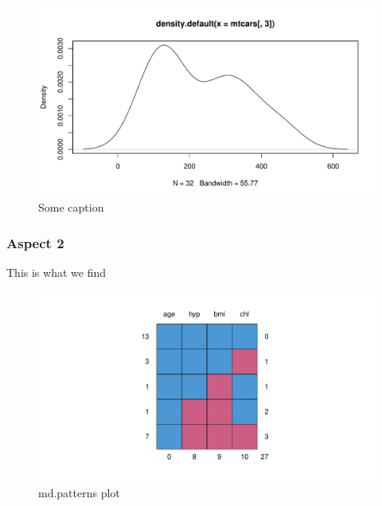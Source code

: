 \documentclass[a4paper,doc,floatsintext,natbib]{apa6}\usepackage[]{graphicx}\usepackage[]{xcolor}
\makeatletter
\def\maxwidth{ %
  \ifdim\Gin@nat@width>\linewidth
    \linewidth
  \else
    \Gin@nat@width
  \fi
}
\newenvironment{knitrout}{}{} %
\makeatother
\begin{document}
	\begin{figure}
	\centering
\begin{knitrout}
\color{fgcolor}

{\centering \includegraphics[width=\maxwidth]{figure/plot-distribution-1} 

}


\end{knitrout}
		\caption{\label{fig:dist} Some caption }
	\end{figure}

\subsubsection{Aspect 2}

	This is what we find



	\begin{figure}
	\centering
\begin{knitrout}
\color{fgcolor}

{\centering \includegraphics[width=\maxwidth]{figure/plot-mice-1} 

}


\end{knitrout}
		\caption{\label{fig:mice} md.patterns plot }
	\end{figure}
\end{document}
